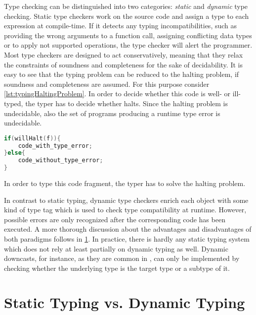 Type checking can be distinguished into two categories: \emph{static} and \emph{dynamic} type checking.
Static type checkers work on the source code and assign a type to each expression at compile-time.
If it detects any typing incompatibilities, such as providing the wrong arguments to a function call, assigning conflicting data types or to apply not supported operations, the type checker will alert the programmer.
Most type checkers are designed to act conservatively, meaning that they relax the constraints of soundness and completeness for the sake of decidability.
It is easy to see that the typing problem can be reduced to the halting problem, if soundness and completeness are assumed.
For this purpose consider \cref{lst:typingHaltingProblem}.
In order to decide whether this code is well- or ill-typed, the typer has to decide whether  halts.
Since the halting problem is undecidable, also the set of programs producing a runtime type error is undecidable.
\begin{listing}[!h]
	\begin{CenteredBox}
		\begin{lstlisting}[language=C++,
		commentstyle=\color{black},
		stringstyle=\color{black},
		keywordstyle=\color{black}\bfseries,
		]
if(willHalt(f)){
	code_with_type_error;
}else{
	code_without_type_error;
}
		\end{lstlisting}
	\end{CenteredBox}
	\caption{In order to type this code fragment, the typer has to solve the halting problem.}
	\label{lst:typingHaltingProblem}
\end{listing}

In contrast to static typing, dynamic type checkers enrich each object with some kind of type tag which is used to check type compatibility at runtime.
However, possible errors are only recognized after the corresponding code has been executed.
A more thorough discussion about the advantages and disadvantages of both paradigms follows in \cref{sec:staticVSDynamic}.
In practice, there is hardly any static typing system which does not rely at least partially on dynamic typing as well.
Dynamic downcasts, for instance, as they are common in , can only be implemented by checking whether the underlying type is the target type or a subtype of it.

\section{Static Typing vs. Dynamic Typing}
\label{sec:staticVSDynamic}

